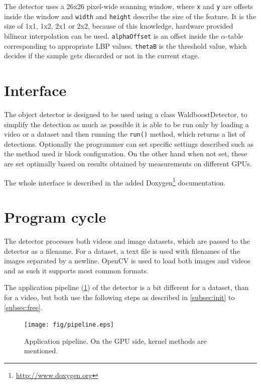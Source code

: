 The detector uses a 26x26 pixel-wide scanning window, where \verb|x| and \verb|y| are offsets inside the window and \verb|width| and \verb|height| describe the size of the feature. It is the size of 1x1, 1x2, 2x1 or 2x2, because of this knowledge, hardware provided bilinear interpolation can be used. \verb|alphaOffset| is an offset inside the $\alpha$-table corresponding to appropriate LBP values. \verb|thetaB| is the threshold value, which decides if the sample gets discarded or not in the current stage.

\section{Interface}

The object detector is designed to be used using a class WaldboostDetector, to simplify the detection as much as possible it is able to be run only by loading a video or a dataset and then running the \verb|run()| method, which returns a list of detections. Optionally the programmer can set specific settings described such as the method used ir block configuration. On the other hand when not set, these are set optimally based on results obtained by measurements on different GPUs.

The whole interface is described in the added Doxygen\footnote{\url{http://www.doxygen.org}} documentation.

\section{Program cycle}

The detector processes both videos and image datasets, which are passed to the detector as a filename. For a dataset, a text file is used with filenames of the images separated by a newline. OpenCV is used to load both images and videos and as such it supports most common formats.

The application pipeline (\ref{fig:pipeline}) of the detector is a bit different for a dataset, than for a video, but both use the following steps as described in \ref{subsec:init} to \ref{subsec:free}.

\begin{center}
\begin{figure}[h!]
	\centering\texttt{[image: fig/pipeline.eps]}
	\caption{Application pipeline. On the GPU side, kernel methods are mentioned.}
	\label{fig:pipeline}	
\end{figure}
\end{center}

